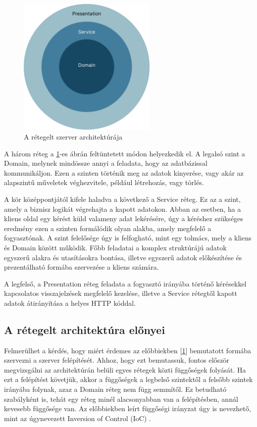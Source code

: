 \begin{figure}[h]
    \centering
    \includegraphics[width=0.6\textwidth]{./images/backend_onion_architecture.png}
    \caption{A rétegelt szerver architektúrája}
    \label{fig:server_onion_architecture}
\end{figure}

A három réteg a \ref{fig:server_onion_architecture}-es ábrán feltüntetett módon helyezkedik el. A legalsó szint a Domain, melynek mindössze annyi a feladata, hogy az adatbázissal kommunikáljon. Ezen a szinten történik meg az adatok kinyerése, vagy akár az alapszintű műveletek véghezvitele, például létrehozás, vagy törlés.

A kör középpontjától kifele haladva a következő a Service réteg. Ez az a szint, amely a biznisz logikát végrehajta a kapott adatokon. Abban az esetben, ha a kliens oldal egy kérést küld valameny adat lekérésére, úgy a kéréshez szükséges eredmény ezen a szinten formálódik olyan alakba, amely megfelelő a fogyasztónak. A szint felelősége úgy is felfogható, mint egy tolmács, mely a kliens és Domain között működik. Főbb feladatai a komplex struktúrájú adatok egyszerű alakra és utasításokra bontása, illetve egyszerű adatok előkészítése és prezentálható formába szervezése a kliens számára.

A legfelső, a Presentation réteg feladata a fogyasztó irányába történő kérésekkel kapcsolatos visszajelzések megfelelő kezelése, illetve a Service rétegtől kapott adatok átirányítása a helyes HTTP kóddal.

\subsection{A rétegelt architektúra előnyei}

Felmerülhet a kérdés, hogy miért érdemes az előbbiekben [\ref{fig:server_onion_architecture}] bemutatott formába szervezni a szerver felépítését. 
Ahhoz, hogy ezt bemutassuk, fontos először megvizsgálni az architektúrán belüli egyes rétegek közti függőségek folyását. 
Ha ezt a felépítést követjük, akkor a függőségek a legbelső szintektől a felsőbb szintek irányába folynak, azaz a Domain réteg nem függ semmítől. 
Ez betudható szabályként is, tehát egy réteg minél alacsonyabban van a felépítésben, annál kevesebb függősége van.
Az előbbiekben leírt függőségi irányzat úgy is nevezhető, mint az úgynevezett Inversion of Control (IoC) \cite{inversionofcontroldocs}.

